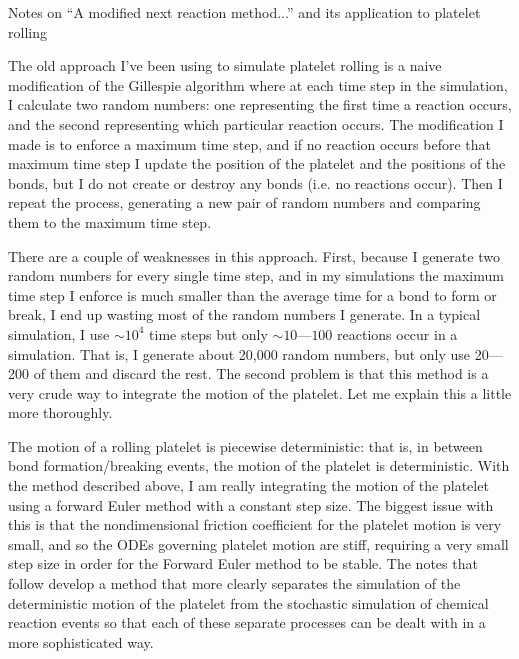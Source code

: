 \documentclass{article}
\begin{document}
\pagestyle{empty}


\begin{center}
{\Large Notes on ``A modified next reaction method...''
  \cite{Anderson2007} and its application to platelet rolling}
\end{center}

The old approach I've been using to simulate platelet rolling is a
naive modification of the Gillespie algorithm where at each time step
in the simulation, I calculate two random numbers: one representing
the first time a reaction occurs, and the second representing which
particular reaction occurs. The modification I made is to enforce a
maximum time step, and if no reaction occurs before that maximum time
step I update the position of the platelet and the positions of the
bonds, but I do not create or destroy any bonds (i.e. no reactions
occur). Then I repeat the process, generating a new pair of random
numbers and comparing them to the maximum time step.

There are a couple of weaknesses in this approach. First, because I
generate two random numbers for every single time step, and in my
simulations the maximum time step I enforce is much smaller than
the average time for a bond to form or break, I end up wasting most of
the random numbers I generate. In a typical simulation, I use
$\sim10^4$ time steps but only $\sim10$---$100$ reactions occur in
a simulation. That is, I generate about 20,000 random numbers, but
only use 20---200 of them and discard the rest. The second problem is
that this method is a very crude way to integrate the motion of the
platelet. Let me explain this a little more thoroughly.

The motion of a rolling platelet is piecewise deterministic: that is,
in between bond formation/breaking events, the motion of the platelet
is deterministic. With the method described above, I am really
integrating the motion of the platelet using a forward Euler method
with a constant step size. The biggest issue with this is that the
nondimensional friction coefficient for the platelet motion is very
small, and so the ODEs governing platelet motion are stiff, requiring
a very small step size in order for the Forward Euler method to be
stable. The notes that follow develop a method that more clearly
separates the simulation of the deterministic motion of the platelet
from the stochastic simulation of chemical reaction events so that
each of these separate processes can be dealt with in a more
sophisticated way.
\end{document}
